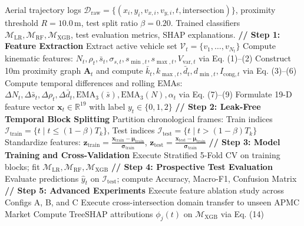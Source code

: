 \documentclass[conference]{IEEEtran}
\begin{document}
\begin{algorithm}[t]
\caption{End-to-End Traffic State Prediction Pipeline}
\label{alg:pipeline}
\begin{algorithmic}[1]
\REQUIRE Aerial trajectory logs $\mathcal{D}_{\text{raw}} = \{(x_i, y_i, v_{x,i}, v_{y,i}, t, \text{intersection})\}$, proximity threshold $R = 10.0\,\text{m}$, test split ratio $\beta = 0.20$.
\ENSURE Trained classifiers $\mathcal{M}_{\text{LR}}, \mathcal{M}_{\text{RF}}, \mathcal{M}_{\text{XGB}}$, test evaluation metrics, SHAP explanations.
\STATE \textbf{// Step 1: Feature Extraction}
        \STATE Extract active vehicle set $\mathcal{V}_t = \{v_1, \dots, v_{N_t}\}$
        \STATE Compute kinematic features: $N_t, \rho_t, \bar{s}_t, \sigma_{s,t}, s_{\min, t}, s_{\max, t}, V_{\text{var}, t}$ via Eq. (1)--(2)
        \STATE Construct 10m proximity graph $\mathbf{A}_t$ and compute $\bar{k}_t, k_{\max, t}, \bar{d}_t, d_{\min, t}, I_{\text{cong}, t}$ via Eq. (3)--(6)
        \STATE Compute temporal differences and rolling EMAs: $\Delta N_t, \Delta \bar{s}_t, \Delta \rho_t, \Delta \bar{d}_t, \text{EMA}_3(\bar{s}), \text{EMA}_3(N), \alpha_t$ via Eq. (7)--(9)
        \STATE Formulate 19-D feature vector $\mathbf{x}_t \in \mathbb{R}^{19}$ with label $y_t \in \{0, 1, 2\}$
    \ENDFOR
\ENDFOR
\STATE \textbf{// Step 2: Leak-Free Temporal Block Splitting}
\STATE Partition chronological frames: Train indices $\mathcal{I}_{\text{train}} = \{t \mid t \le (1-\beta)T_k\}$, Test indices $\mathcal{I}_{\text{test}} = \{t \mid t > (1-\beta)T_k\}$
\STATE Standardize features: $\mathbf{z}_{\text{train}} = \frac{\mathbf{x}_{\text{train}} - \boldsymbol{\mu}_{\text{train}}}{\boldsymbol{\sigma}_{\text{train}}}$, $\mathbf{z}_{\text{test}} = \frac{\mathbf{x}_{\text{test}} - \boldsymbol{\mu}_{\text{train}}}{\boldsymbol{\sigma}_{\text{train}}}$
\STATE \textbf{// Step 3: Model Training and Cross-Validation}
\STATE Execute Stratified 5-Fold CV on training blocks; fit $\mathcal{M}_{\text{LR}}, \mathcal{M}_{\text{RF}}, \mathcal{M}_{\text{XGB}}$
\STATE \textbf{// Step 4: Prospective Test Evaluation}
\STATE Evaluate predictions $\hat{y}_t$ on $\mathcal{I}_{\text{test}}$; compute Accuracy, Macro-F1, Confusion Matrix
\STATE \textbf{// Step 5: Advanced Experiments}
\STATE Execute feature ablation study across Configs A, B, and C
\STATE Execute cross-intersection domain transfer to unseen APMC Market
\STATE Compute TreeSHAP attributions $\phi_j(t)$ on $\mathcal{M}_{\text{XGB}}$ via Eq. (14)
\end{algorithmic}
\end{algorithm}
\end{document}
